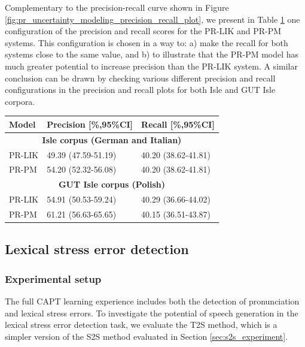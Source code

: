 \documentclass[]{interact}
\theoremstyle{plain}%
\theoremstyle{definition}
\theoremstyle{remark}
\begin{document}
Complementary to the precision-recall curve shown in Figure \ref{fig:pr_uncertainty_modeling_precision_recall_plot}, we present in Table \ref{tab:pr_pm_results} one configuration of the precision and recall scores for the PR-LIK and PR-PM systems. This configuration is chosen in a way to: a) make the recall for both systems close to the same value, and b) to illustrate that the PR-PM model has much greater potential to increase precision than the PR-LIK system. A similar conclusion can be drawn by checking various different precision and recall configurations in the precision and recall plots for both Isle and GUT Isle corpora.

\begin{table}
  {
  \centering
  \begin{tabular}{lll}
    \toprule  
   Model  & Precision [\%,95\%CI] & Recall [\%,95\%CI] \\
    \midrule
    \multicolumn{3}{c}{\textbf{Isle corpus (German and Italian)}} \\
    PR-LIK & 49.39 (47.59-51.19) & 40.20 (38.62-41.81)\\ 
    PR-PM & 54.20 (52.32-56.08) & 40.20 (38.62-41.81)\\  
     \multicolumn{3}{c}{\textbf{GUT Isle corpus (Polish)}} \\
    PR-LIK & 54.91 (50.53-59.24) & 40.29 (36.66-44.02)\\ 
    PR-PM & 61.21 (56.63-65.65) & 40.15 (36.51-43.87)\\  
    \bottomrule
  \end{tabular}
  }
  \label{tab:pr_pm_results}
\end{table}

\subsection{Lexical stress error detection}
\label{sec:experiments_lexical_stress}

\subsubsection{Experimental setup}

The full CAPT learning experience includes both the detection of pronunciation and lexical stress errors. To investigate the potential of speech generation in the lexical stress error detection task, we evaluate the T2S method, which is a simpler version of the S2S method evaluated in Section \ref{sec:s2s_experiment}. 
\end{document}
